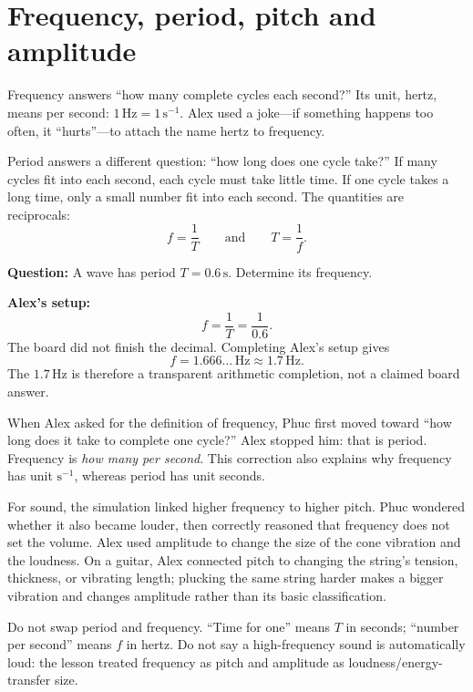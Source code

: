 \documentclass[11pt,a4paper]{article}
\newcommand{\trap}[1]{\begin{mistakebox}#1\end{mistakebox}}
\begin{document}
\section{Frequency, period, pitch and amplitude}
Frequency answers ``how many complete cycles each second?'' Its unit, hertz, means per second: $1\,\mathrm{Hz}=1\,\mathrm{s^{-1}}$. Alex used a joke---if something happens too often, it ``hurts''---to attach the name hertz to frequency.

Period answers a different question: ``how long does one cycle take?'' If many cycles fit into each second, each cycle must take little time. If one cycle takes a long time, only a small number fit into each second. The quantities are reciprocals:
\[
\boxed{f=\frac{1}{T}}\qquad\text{and}\qquad\boxed{T=\frac{1}{f}}.
\]

\begin{examplebox}[title=\textbf{Lesson example: period to frequency}]
\textbf{Question:} A wave has period $T=0.6\,\mathrm{s}$. Determine its frequency.

\textbf{Alex's setup:}
\[
f=\frac{1}{T}=\frac{1}{0.6}.
\]
The board did not finish the decimal. Completing Alex's setup gives
\[
f=1.666\ldots\,\mathrm{Hz}\approx1.7\,\mathrm{Hz}.
\]
The $1.7\,\mathrm{Hz}$ is therefore a transparent arithmetic completion, not a claimed board answer.
\end{examplebox}

When Alex asked for the definition of frequency, Phuc first moved toward ``how long does it take to complete one cycle?'' Alex stopped him: that is period. Frequency is \emph{how many per second}. This correction also explains why frequency has unit $\mathrm{s^{-1}}$, whereas period has unit seconds.

For sound, the simulation linked higher frequency to higher pitch. Phuc wondered whether it also became louder, then correctly reasoned that frequency does not set the volume. Alex used amplitude to change the size of the cone vibration and the loudness. On a guitar, Alex connected pitch to changing the string's tension, thickness, or vibrating length; plucking the same string harder makes a bigger vibration and changes amplitude rather than its basic classification.

\trap{Do not swap period and frequency. ``Time for one'' means $T$ in seconds; ``number per second'' means $f$ in hertz. Do not say a high-frequency sound is automatically loud: the lesson treated frequency as pitch and amplitude as loudness/energy-transfer size.}
\end{document}
